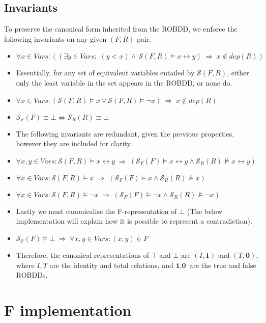 \documentclass[11pt,table]{article}
\newcounter{r}
\newcommand{\biim}{\leftrightarrow}
\newcommand{\impl}{\hspace{3pt}\Rightarrow\hspace{3pt}}
\newcommand{\semR}[1]{\mathcal{S}_R(#1)}
\newcommand{\semF}[1]{\mathcal{S}_F(#1)}
\newcommand{\semFR}[1]{\mathcal{S}(#1)}
\newcommand{\ifff}{\Leftrightarrow}
\begin{document}
\subsection{Invariants}

To preserve the canonical form inherited from the ROBDD, we enforce the following invariants on any given $ (F,R) $ pair.

\begin{itemize}
	\item $ \forall x \in Vars: ( (\exists y\in Vars: \hspace{2pt} \hspace{2pt}(y<x) \wedge \hspace{2pt} \semFR{F,R} \vDash x\biim y) \impl x \notin dep(R))$ 
	\item[] Essentially, for any set of equivalent variables entailed by $ \semFR{F,R} $, either only the least variable in the set appears in the ROBDD, or none do. 
	\item $ \forall x\in Vars:  (\semFR{F,R}\vDash x \vee \semFR{F,R}\vDash \neg x) \impl x \notin dep(R)$
	\item $ \semF{F} \equiv \bot \ifff \semR{R} \equiv \bot $
	\item[] The following invariants are redundant, given the previous properties, however they are included for clarity.
	\item $ \forall x,y \in Vars: \semFR{F,R} \vDash x \biim y \impl (\semF{F} \vDash x\biim y \wedge \semR{R} \nvDash x\biim y)$
	\item $ \forall x \in Vars: \semFR{F,R} \vDash x \impl (\semF{F} \vDash x \wedge \semR{R} \nvDash x) $
	\item $ \forall x \in Vars: \semFR{F,R} \vDash \neg x \impl (\semF{F} \vDash \neg x \wedge \semR{R} \nvDash \neg x) $
	\item[] Lastly we must canonicalise the F-representation of $ \bot $ (The below implementation will explain how it is possible to represent a contradiction).
	\item $ \semF{F} \vDash \bot \impl \forall x,y \in Vars: (x,y) \in F $
	\item[] Therefore, the canonical representations of $ \top $ and $ \bot $ are $ (I,\textbf{1}) $ and $ (T, \textbf{0}) $, where $ I, T$ are the identity and total relations, and $ \textbf{1}, \textbf{0} $ are the true and false ROBDDs.
\end{itemize}

 

\section{F implementation}
\end{document}
